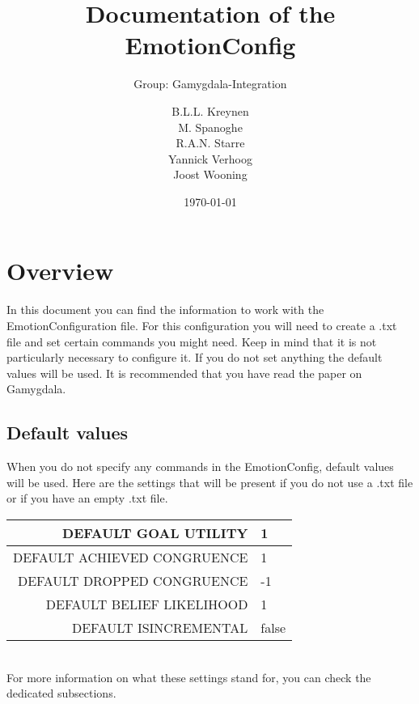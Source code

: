 \documentclass{scrartcl}
\begin{document}
\title{Documentation of the EmotionConfig}
\subtitle{Group: Gamygdala-Integration}
\date{\today{}}

\author{
    \begin{tabular}{l r}
      B.L.L. Kreynen\\
      M. Spanoghe\\
      R.A.N. Starre\\
      Yannick Verhoog\\
      Joost Wooning\\
    \end{tabular}
}

\maketitle \thispagestyle{empty} \pagebreak
\pagebreak
\tableofcontents
\pagebreak

\section{Overview}
In this document you can find the information to work with the EmotionConfiguration file. For this configuration you will need to create a .txt file and set certain commands you might need. Keep in mind that it is not particularly necessary to configure it. If you do not set anything the default values will be used. It is recommended that you have read the paper on Gamygdala\cite{Gamygdala}. 

\subsection{Default values}
When you do not specify any commands in the EmotionConfig, default values will be used. Here are the settings that will be present if you do not use a .txt file or if you have an empty .txt file.\\
\begin{tabular}{|r|l|}
\hline  DEFAULT GOAL UTILITY & 1 \\ 
\hline  DEFAULT ACHIEVED CONGRUENCE & 1  \\ 
\hline  DEFAULT DROPPED CONGRUENCE & -1   \\ 
\hline  DEFAULT BELIEF LIKELIHOOD& 1   \\ 
\hline  DEFAULT ISINCREMENTAL & false   \\
\hline
\end{tabular}
\\
For more information on what these settings stand for, you can check the dedicated subsections.
\end{document}
